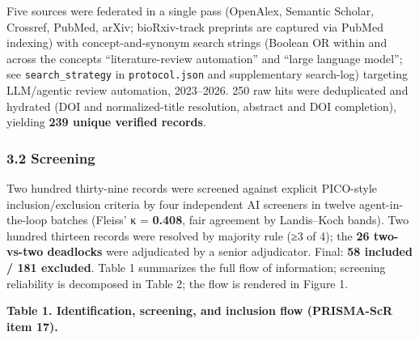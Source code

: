 \documentclass[11pt]{article}
\begin{document}
Five sources were federated in a single pass (OpenAlex, Semantic
Scholar, Crossref, PubMed, arXiv; bioRxiv-track preprints are captured
via PubMed indexing) with concept-and-synonym search strings (Boolean OR
within and across the concepts ``literature-review automation'' and
``large language model''; see \texttt{search\_strategy} in
\texttt{protocol.json} and supplementary search-log) targeting
LLM/agentic review automation, 2023--2026. 250 raw hits were
deduplicated and hydrated (DOI and normalized-title resolution, abstract
and DOI completion), yielding \textbf{239 unique verified records}.

\subsubsection{3.2 Screening}\label{screening}

Two hundred thirty-nine records were screened against explicit
PICO-style inclusion/exclusion criteria by four independent AI screeners
in twelve agent-in-the-loop batches (Fleiss' κ = \textbf{0.408}, fair
agreement by Landis--Koch bands). Two hundred thirteen records were
resolved by majority rule (≥3 of 4); the \textbf{26 two-vs-two
deadlocks} were adjudicated by a senior adjudicator. Final: \textbf{58
included / 181 excluded}. Table 1 summarizes the full flow of
information; screening reliability is decomposed in Table 2; the flow is
rendered in Figure 1.

\textbf{Table 1. Identification, screening, and inclusion flow
(PRISMA-ScR item 17).}
\end{document}
